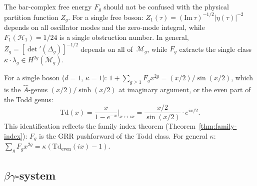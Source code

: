 \begin{remark}
\label{rem:heisenberg-partition}
The bar-complex free energy $F_g$ should not be confused with the physical partition function $Z_g$.  For a single free boson: $Z_1(\tau) = (\mathrm{Im}\,\tau)^{-1/2}|\eta(\tau)|^{-2}$ depends on all oscillator modes and the zero-mode integral, while $F_1(\mathcal{H}_1) = 1/24$ is a single obstruction number.  In general, $Z_g = [\det'(\Delta_g)]^{-1/2}$ depends on all of~$\mathcal{M}_g$, while $F_g$ extracts the single class $\kappa \cdot \lambda_g \in H^{2g}(\overline{\mathcal{M}}_g)$.
\end{remark}

\begin{remark}\label{rem:a-hat-genus}
For a single boson ($d=1$, $\kappa=1$): $1 + \sum_{g \geq 1} F_g x^{2g} = (x/2)/\sin(x/2)$, which is the $\hat{A}$-genus $(x/2)/\sinh(x/2)$ at imaginary argument, or the even part of the Todd genus:
\begin{equation}\label{eq:a-hat-identification}
\mathrm{Td}(x) = \frac{x}{1-e^{-x}} \bigg|_{x \mapsto ix} = \frac{x/2}{\sin(x/2)} \cdot e^{ix/2}.
\end{equation}
This identification reflects the family index theorem (Theorem~\ref{thm:family-index}): $F_g$ is the GRR pushforward of the Todd class.  For general $\kappa$: $\sum_g F_g x^{2g} = \kappa(\mathrm{Td}_{\mathrm{even}}(ix) - 1)$.
\end{remark}

\subsection{\texorpdfstring{$\beta\gamma$-system}{beta-gamma system}}\label{subsec:betagamma-all-genera}

